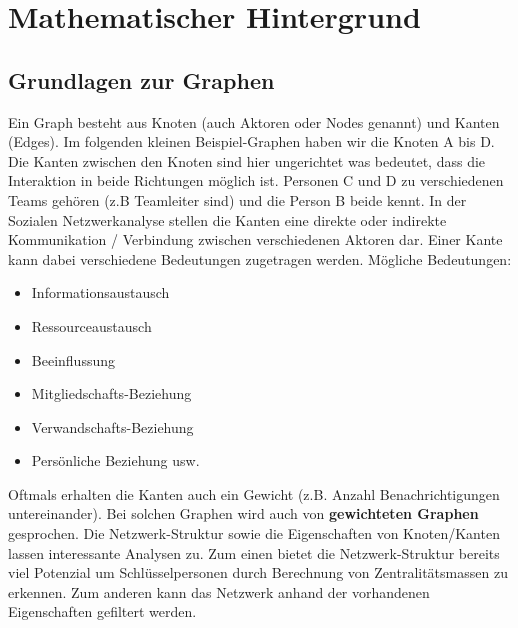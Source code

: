 \documentclass[a4paper,landscape,12pt]{scrreprt}
\begin{document}
\part{Mathematischer Hintergrund}
\begin{multicols*}{2}
\chapter{Grundlagen zur Graphen} %
\label{cha:grundlagen_zur_graphen}
Ein Graph besteht aus Knoten (auch Aktoren oder Nodes genannt) und Kanten (Edges). Im folgenden
kleinen Beispiel-Graphen haben wir die Knoten A bis D. Die Kanten zwischen den Knoten sind hier
ungerichtet was bedeutet, dass die Interaktion in beide Richtungen möglich ist.
Personen C und D zu verschiedenen Teams gehören (z.B Teamleiter sind) und die Person B beide kennt.
In der Sozialen Netzwerkanalyse stellen die Kanten eine direkte oder indirekte Kommunikation /
Verbindung zwischen verschiedenen Aktoren dar. Einer Kante kann dabei verschiedene Bedeutungen
zugetragen werden. Mögliche Bedeutungen:
\begin{itemize}
	\item Informationsaustausch
\item Ressourceaustausch
\item Beeinflussung
\item Mitgliedschafts-Beziehung
\item Verwandschafts-Beziehung
\item Persönliche Beziehung
usw.
\end{itemize}
Oftmals erhalten die Kanten auch ein Gewicht (z.B. Anzahl Benachrichtigungen untereinander). Bei
solchen Graphen wird auch von \textbf{gewichteten Graphen} gesprochen.
Die Netzwerk-Struktur sowie die Eigenschaften von Knoten/Kanten lassen interessante Analysen zu.
Zum einen bietet die Netzwerk-Struktur bereits viel Potenzial um Schlüsselpersonen durch Berechnung
von Zentralitätsmassen zu erkennen. Zum anderen kann das Netzwerk anhand der vorhandenen
Eigenschaften gefiltert werden.



\end{multicols*}
\end{document}
